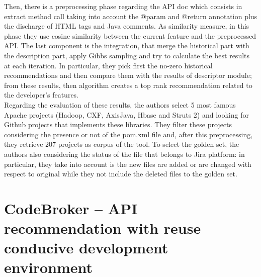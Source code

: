 Then, there is a preprocessing phase regarding the API doc which consists in extract method call taking into account the @param and @return annotation plus the discharge of HTML tags and Java comments. As similarity measure, in this phase they use cosine similarity between the current feature and the preprocessed API. The last component is the integration, that merge the historical part with the description part, apply Gibbs sampling and try to calculate the best results at each iteration. In particular, they pick first the no-zero historical recommendations and then compare them with the results of descriptor module; from these results, then algorithm creates a top rank recommendation related to the developer's features. \\
Regarding the evaluation of these results, the authors select 5 most famous Apache projects (Hadoop, CXF, AxisJava, Hbase and Struts 2) and looking for Github projects that implements these libraries. They filter these projects considering the presence or not of the pom.xml file and, after this preprocessing, they retrieve 207 projects as corpus of the tool. To select the golden set, the authors also considering the status of the file that belongs to Jira platform: in particular, they take into account is the new files are added or are changed with respect to original while they not include the deleted files to the golden set.


\section{CodeBroker -- API recommendation with reuse conducive development 
environment}

